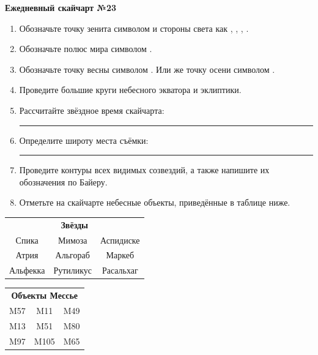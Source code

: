 \documentclass{./SAS-class-skygen}
\begin{document}
    
    
    
	\begin{center}
		\large\textbf{Ежедневный скайчарт №23}
	\end{center}

	\begin{enumerate}
		\item Обозначьте точку зенита символом  и стороны света как , , , .
		\item Обозначьте полюс мира символом .
		\item Обозначьте точку весны символом \Aries. Или же точку осени символом \Libra.
		\item Проведите большие круги небесного экватора и эклиптики.
		\item Рассчитайте звёздное время скайчарта: \rule{2cm}{0.4pt}
		\item Определите широту места съёмки: \rule{2cm}{0.4pt}
		\item Проведите контуры всех видимых созвездий, а также напишите их обозначения по Байеру.
		\item Отметьте на скайчарте небесные объекты, приведённые в таблице ниже.
	\end{enumerate}
	
    \vspace{0.5cm}

    \begin{table}[h!]
    \centering
    \begin{tabular}{ccc}
    \multicolumn{3}{c}{\textbf{Звёзды}} \\ Спика & Мимоза & Аспидиске \\
Атрия & Альгораб & Маркеб \\
Альфекка & Рутиликус & Расальхаг \\

\end{tabular}
    \hfill
    \begin{tabular}{ccc}
    \multicolumn{3}{c}{\textbf{Объекты Мессье}} \\ M57 & M11 & M49 \\
M13 & M51 & M80 \\
M97 & M105 & M65 \\

\end{tabular}
    \end{table}
	
\end{document}
